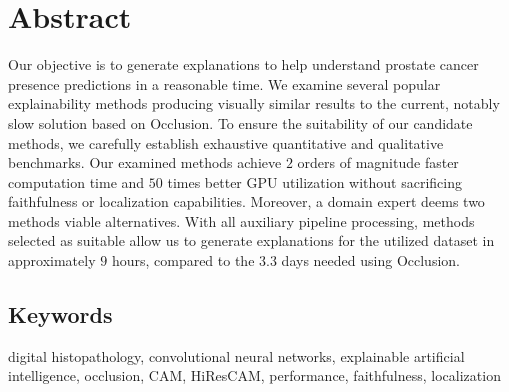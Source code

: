 \chapter*{Abstract}

Our objective is to generate explanations to help understand prostate cancer presence predictions in a reasonable time.
We examine several popular explainability methods producing visually similar results to the current, notably slow solution based on Occlusion.
To ensure the suitability of our candidate methods, we carefully establish exhaustive quantitative and qualitative benchmarks.
Our examined methods achieve $2$ orders of magnitude faster computation time and $50$ times better GPU utilization without sacrificing faithfulness or localization capabilities.
Moreover, a domain expert deems two methods viable alternatives.
With all auxiliary pipeline processing, methods selected as suitable allow us to generate explanations for the utilized dataset in approximately $9$ hours, compared to the $3.3$ days needed using Occlusion.

\section*{Keywords}
digital histopathology, convolutional neural networks, explainable artificial intelligence, occlusion, CAM, HiResCAM, performance, faithfulness, localization
